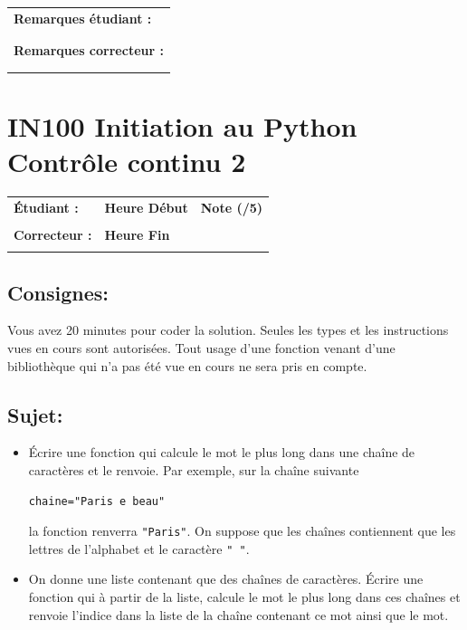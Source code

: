 \documentclass[a4paper,11pt]{article}
\begin{document}
\begin{table}[h!]
\centering
\renewcommand{\arraystretch}{1.4} %
\begin{tabular}{|p{15cm}|}
\hline
\textbf{Remarques étudiant :}    \\
 \\
 \\
\hline
\textbf{Remarques correcteur :}  \\
 \\
 \\
\hline
\end{tabular}
\end{table}

\newpage


\section*{\center IN100 Initiation au Python\\
Contrôle continu 2}


\begin{table}[h!]
\centering
\renewcommand{\arraystretch}{1.4} %
\begin{tabular}{|p{10cm}|p{3cm}|p{2cm}|}
\hline
\textbf{Étudiant :} & \textbf{Heure Début }  & \textbf{Note (/5) }  \\
& & \\
\hline
\textbf{Correcteur :} & \textbf{Heure Fin } & \\
& & \\
\hline

\hline
\end{tabular}
\end{table}

\subsection*{Consignes:} Vous avez 20 minutes pour coder la solution. Seules les types et les instructions vues en cours sont autorisées. Tout usage d'une fonction 
venant d'une bibliothèque qui n'a pas été vue en cours ne sera pris en compte. 


\subsection*{Sujet:}


\begin{itemize}
\item[1.] \'Ecrire une fonction qui calcule le mot le plus long dans une chaîne de caractères et le renvoie. 
Par exemple, sur la chaîne suivante 
\begin{verbatim}
chaine="Paris e beau"
\end{verbatim}
la fonction renverra \texttt{"Paris"}.  On suppose que les chaînes contiennent que les lettres de l'alphabet et le caractère \texttt{" "}. 

\item[2.] On  donne une liste contenant que des chaînes de caractères. 
\'Ecrire une fonction qui à partir de la liste, calcule le mot le plus long dans ces chaînes et renvoie l'indice dans la liste de la chaîne  contenant ce mot ainsi que le mot. 
\end{itemize}
\end{document}
